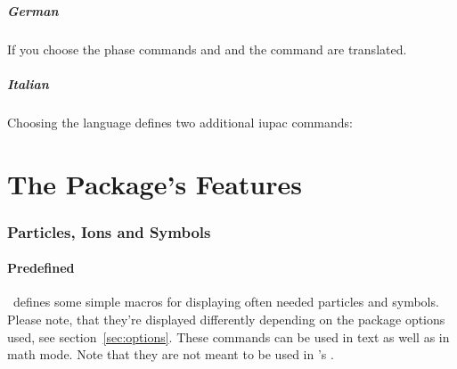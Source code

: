 \documentclass[load-preamble+]{cnltx-doc}
\begin{document}
\subsubsection{German}
If you choose  the phase commands  and 
and the command  are translated.

\subsubsection{Italian}
%
Choosing the language  defines two additional \ac{iupac} commands:
\begin{commands}
   \iupac{\ter}
   \iupac{\sin}
\end{commands}

\part{The Package's Features}\label{part:chemmacros}
\section{Particles, Ions and Symbols}\label{sec:particles}
\subsection{Predefined}

\chemmacros\ defines some simple macros for displaying often needed particles
and symbols.  Please note, that they're displayed differently depending on the
package options used, see section~\ref{sec:options}.  These commands can be
used in text as well as in math mode.  Note that they are not meant to be used
in \chemformula's .
\end{document}

